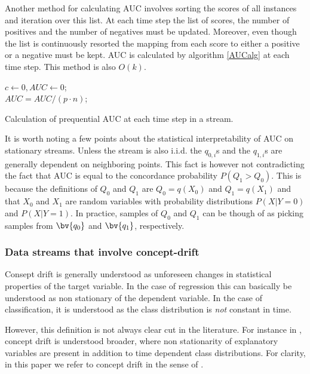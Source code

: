 Another method for calculating AUC  involves sorting the scores of all instances and iteration over this list. At each time step the list of scores, the number of positives and the number of negatives must be updated.  Moreover, even though the list is continuously resorted the mapping from each score to either a positive or a negative must be kept. AUC is calculated by algorithm \ref{AUCalg} at each time step.  This method is also $O(k)$.


\begin{algorithm}[H]
$c \leftarrow 0, AUC \leftarrow 0$;\\
$ AUC = AUC/(p \cdot n)$;
\label{AUCalg}
 \caption{Calculation of prequential AUC at each time step in a stream.}
\end{algorithm}

It is worth noting a few points about the statistical interpretability of AUC on stationary streams.  Unless the stream is also i.i.d. the $q_{0,i}$s and the $q_{1,i}$s are generally dependent on neighboring points.  This fact is however not contradicting the fact that AUC is equal to the concordance probability $ P(Q_1 > Q_0)$.  This is because the definitions of $Q_0$ and $Q_1$ are $Q_0 = q(X_0)$ and $Q_1 = q(X_1)$ and 
that $X_0$ and $X_1$ are random variables with probability distributions $P(X | Y = 0)$ and $P(X | Y = 1)$.  In practice, samples of $Q_0$ and $Q_1$ can be though of as picking samples from $\bv{q_0}$ and $\bv{q_1}$, respectively.

\subsubsection{Data streams that involve concept-drift}

Consept drift is generally understood as unforeseen changes in statistical properties of the target variable.  In the case of regression this can basically be understood as non stationary of the dependent variable.  In the case of classification, it is understood as the class distribution is \emph{not} constant in time.  

However, this definition is not always clear cut in the literature.  For instance in \cite{Brz14}, concept drift is understood broader, where non stationarity of explanatory variables are present in addition to time dependent class distributions.   For clarity, in this paper we refer to concept drift in the sense of \cite{Brz14}.

